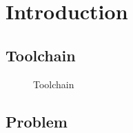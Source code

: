 \section{Introduction}

\subsection{Toolchain}

\begin{figure}[h]
  \centering
  
  \caption{Toolchain}
\end{figure}

\subsection{Problem}


